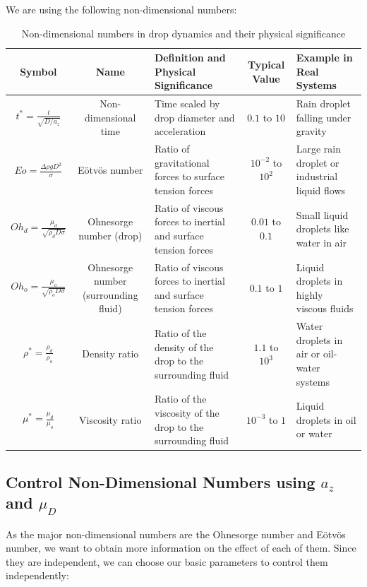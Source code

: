 \documentclass[12pt]{article}
\begin{document}
We are using the following non-dimensional numbers:

\begin{table}[H]
\scriptsize
\centering
\caption{Non-dimensional numbers in drop dynamics and their physical significance}
\renewcommand{\arraystretch}{1.2} %
\begin{tabularx}{\textwidth}{|c|c|X|c|X|}
\hline
\textbf{Symbol} & \textbf{Name} & \textbf{Definition and Physical Significance} & \textbf{Typical Value} & \textbf{Example in Real Systems} \\ \hline
$t^* = \frac{t}{\sqrt{D/a_z}}$ & Non-dimensional time & Time scaled by drop diameter and acceleration & $0.1$ to $10$ & Rain droplet falling under gravity \\ \hline
$Eo = \frac{\Delta \rho g D^2}{\sigma}$ & Eötvös number & Ratio of gravitational forces to surface tension forces & $10^{-2}$ to $10^2$ & Large rain droplet or industrial liquid flows \\ \hline
$Oh_d = \frac{\mu_d}{\sqrt{\rho_d D \sigma}}$ & Ohnesorge number (drop) & Ratio of viscous forces to inertial and surface tension forces & $0.01$ to $0.1$ & Small liquid droplets like water in air \\ \hline
$Oh_o = \frac{\mu_o}{\sqrt{\rho_o D \sigma}}$ & Ohnesorge number (surrounding fluid) & Ratio of viscous forces to inertial and surface tension forces & $0.1$ to $1$ & Liquid droplets in highly viscous fluids \\ \hline
$\rho^* = \frac{\rho_d}{\rho_o}$ & Density ratio & Ratio of the density of the drop to the surrounding fluid & $1.1$ to $10^3$ & Water droplets in air or oil-water systems \\ \hline
$\mu^* = \frac{\mu_d}{\mu_o}$ & Viscosity ratio & Ratio of the viscosity of the drop to the surrounding fluid & $10^{-3}$ to $1$ & Liquid droplets in oil or water \\ \hline
\end{tabularx}
\label{tab:NonDimensionalNumbersSignificance}
\end{table}


\subsection{Control Non-Dimensional Numbers using $a_z$ and $\mu_D$}

As the major non-dimensional numbers are the Ohnesorge number and Eötvös number, we want to obtain more information on the effect of each of them. Since they are independent, we can choose our basic parameters to control them independently:
\end{document}
